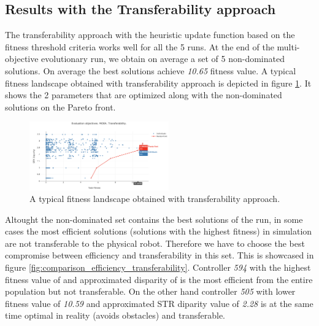 \subsection{Results with the Transferability approach}

The transferability approach with the heuristic update function based on the fitness threshold criteria works well for all the 5 runs. At the end of the multi-objective evolutionary run, we obtain on average a set of 5 non-dominated solutions. On average the best solutions achieve \textit{10.65} fitness value. A typical fitness landscape obtained with transferability approach is depicted in figure \ref{fig:best_pareto}. It shows the 2 parameters that are optimized along with the non-dominated solutions on the Pareto front.

\begin{figure}[H]
	\centering
  	\includegraphics[width=6cm]{include/images/pareto_best_moea.PNG}
  	\caption{A typical fitness landscape obtained with transferability approach.}
  	\label{fig:best_pareto}
\end{figure}

Altought the non-dominated set contains the best solutions of the run, in some cases the most efficient solutions (solutions with the highest fitness) in simulation are not transferable to the physical  robot. Therefore we have to choose the best compromise between efficiency and transferability in this set. This is showcased in figure \ref{fig:comparison_efficiency_transferability}. Controller \textit{594} with the highest fitness value of  and approximated disparity of  is the most efficient from the entire population but not transferable. On the other hand controller \textit{505} with lower fitness value of \textit{10.59} and approximated STR diparity value of \textit{2.28} is at the same time optimal in reality (avoids obstacles) and transferable.

